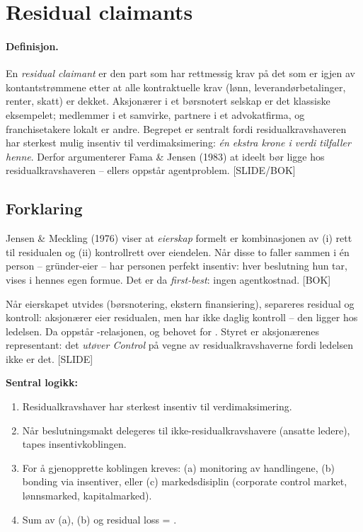\section{Residual claimants}\label{thr:residual-claimants}

\paragraph{Definisjon.} En \emph{residual claimant} er den part som har rettmessig krav på det som er igjen av kontantstrømmene etter at alle kontraktuelle krav (lønn, leverandørbetalinger, renter, skatt) er dekket. Aksjonærer i et børsnotert selskap er det klassiske eksempelet; medlemmer i et samvirke, partnere i et advokatfirma, og franchisetakere lokalt er andre. Begrepet er sentralt fordi residualkravshaveren har sterkest mulig insentiv til verdimaksimering: \emph{én ekstra krone i verdi tilfaller henne}. Derfor argumenterer Fama \& Jensen (1983) at  ideelt bør ligge hos residualkravshaveren -- ellers oppstår agentproblem. [SLIDE/BOK]

\subsection*{Forklaring}

Jensen \& Meckling (1976) viser at \emph{eierskap} formelt er kombinasjonen av (i) rett til residualen og (ii) kontrollrett over eiendelen. Når disse to faller sammen i én person -- gründer-eier -- har personen perfekt insentiv: hver beslutning hun tar, vises i hennes egen formue. Det er da \emph{first-best}: ingen agentkostnad. [BOK]

Når eierskapet utvides (børsnotering, ekstern finansiering), separeres residual og kontroll: aksjonærer eier residualen, men har ikke daglig kontroll -- den ligger hos ledelsen. Da oppstår -relasjonen,  og behovet for . Styret er aksjonærenes representant: det \emph{utøver Control} på vegne av residualkravshaverne fordi ledelsen ikke er det. [SLIDE]

\textbf{Sentral logikk:}
\begin{enumerate}
\item Residualkravshaver har sterkest insentiv til verdimaksimering.
\item Når beslutningsmakt delegeres til ikke-residualkravshavere (ansatte ledere), tapes insentivkoblingen.
\item For å gjenopprette koblingen kreves: (a) monitoring av handlingene, (b) bonding via insentiver, eller (c) markedsdisiplin (corporate control market, lønnsmarked, kapitalmarked).
\item Sum av (a), (b) og residual loss = .
\end{enumerate}

